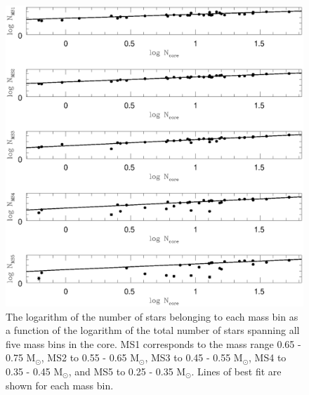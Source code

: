 \begin{figure} [!h]
  \begin{center}
 \includegraphics[scale=0.5]{Chapter-6/Ncore_vs_Nms_rc_new.ps}
\caption[Logarithm of the number of
stars belonging to each mass bin as a function of the
logarithm of the total number of stars spanning all five mass
bins in the core]{The logarithm of the number of
stars belonging to each mass bin as a function of the
logarithm of the total number of stars spanning all five mass
bins in the core.  MS1 corresponds to the mass range 0.65 - 0.75 M$_{\odot}$, MS2
to 0.55 - 0.65 M$_{\odot}$, MS3 to 0.45 - 0.55 M$_{\odot}$, MS4 to
0.35 - 0.45 M$_{\odot}$, and MS5 to 0.25 - 0.35 M$_{\odot}$.  Lines of
best fit are shown for each mass bin. 
\label{fig:Ncore_vs_Nms_rc}}
\end{center}
\end{figure}


